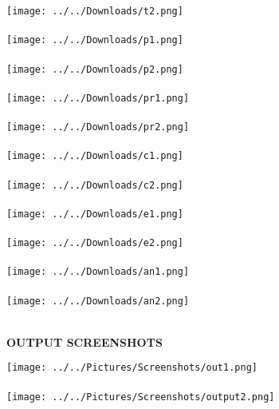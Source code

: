\documentclass{report}
\begin{document}
\texttt{[image: ../../Downloads/t2.png]} \\\\
\texttt{[image: ../../Downloads/p1.png]} \\\\
\texttt{[image: ../../Downloads/p2.png]} \\\\
\texttt{[image: ../../Downloads/pr1.png]} \\\\
\texttt{[image: ../../Downloads/pr2.png]} \\\\
\texttt{[image: ../../Downloads/c1.png]} \\\\
\texttt{[image: ../../Downloads/c2.png]} \\\\
\texttt{[image: ../../Downloads/e1.png]} \\\\
\texttt{[image: ../../Downloads/e2.png]} \\\\
\texttt{[image: ../../Downloads/an1.png]} \\\\
\texttt{[image: ../../Downloads/an2.png]} \\\\
\pagebreak
\begin{center}
\textbf{OUTPUT SCREENSHOTS}\\
\vspace{4mm}
\end{center}
\texttt{[image: ../../Pictures/Screenshots/out1.png]} \\\\
\texttt{[image: ../../Pictures/Screenshots/output2.png]} \\\\
\end{document}
